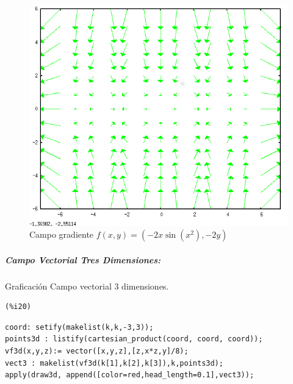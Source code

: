 \documentclass[12pt]{article}
\begin{document}
\begin{figure}[H]
\centering
\includegraphics[scale=0.5]{10.png}
\caption{Campo gradiente  $f(x,y)= (-2x\sin(x^2),-2y)$ }
\end{figure}


\subparagraph{Campo Vectorial Tres Dimensiones:}
Graficación Campo vectorial 3 dimensiones.

\noindent
\begin{minipage}[t]{8ex}{\color{red}\bf
\begin{verbatim}
(%i20) 
\end{verbatim}}
\end{minipage}
\begin{minipage}[t]{\textwidth}{\color{blue}
\begin{verbatim}
coord: setify(makelist(k,k,-3,3));
points3d : listify(cartesian_product(coord, coord, coord));
vf3d(x,y,z):= vector([x,y,z],[z,x*z,y]/8);
vect3 : makelist(vf3d(k[1],k[2],k[3]),k,points3d);
apply(draw3d, append([color=red,head_length=0.1],vect3));
\end{verbatim}}
\end{minipage}
\end{document}
